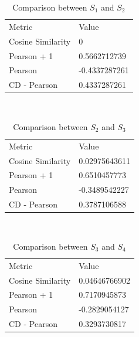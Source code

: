 \begin{columns}
    \begin{column}{0.5\textwidth}
        \begin{table}[]
            \begin{tabular}{ll}
            Metric            & Value         \\
            Cosine Similarity & 0             \\
            Pearson + 1       & 0.5662712739  \\
            Pearson           & -0.4337287261 \\
            CD - Pearson      & 0.4337287261 
            \end{tabular}
            \caption{Comparison between $S_1$ and $S_2$}
        \end{table}\\
        \begin{table}[]
            \begin{tabular}{ll}
            Metric            & Value         \\
            Cosine Similarity & 0.02975643611 \\
            Pearson + 1       & 0.6510457773  \\
            Pearson           & -0.3489542227 \\
            CD - Pearson      & 0.3787106588
            \end{tabular}
            \caption{Comparison between $S_2$ and $S_3$}
        \end{table}\\
        \begin{table}[]
            \begin{tabular}{ll}
            Metric            & Value         \\
            Cosine Similarity & 0.04646766902 \\
            Pearson + 1       & 0.7170945873  \\
            Pearson           & -0.2829054127 \\
            CD - Pearson      & 0.3293730817
            \end{tabular}
            \caption{Comparison between $S_3$ and $S_4$}
        \end{table}
    \end{column}
    \begin{column}{0.5\textwidth}
        \begin{table}[]
            \begin{tabular}{ll}

\end{tabular}
\end{table}
\end{column}
\end{columns}
